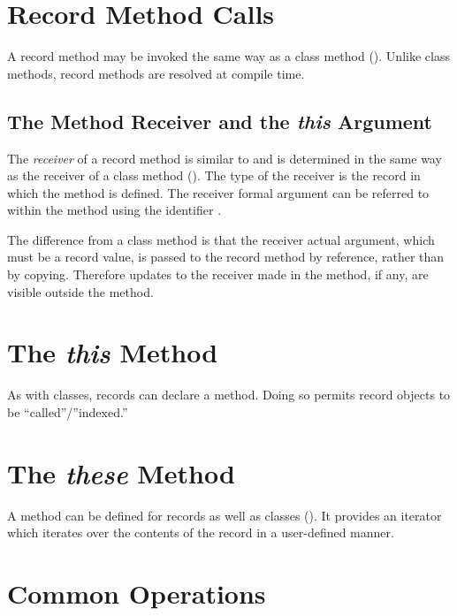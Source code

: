 \section{Record Method Calls}
\label{Record_Method_Access}

A record method may be invoked the same way as a class method
().  Unlike class methods, record methods are
resolved at compile time.  

\subsection{The Method Receiver and the {\em this} Argument}
\label{The_this_Reference}

The \emph{receiver} of a record method is similar to and is determined in the
same way as the receiver of a class method ().
The type of the receiver is the record in which the method is defined.
The receiver formal argument can be referred to within the method
using the identifier .

The difference from a class method is that the receiver actual argument,
which must be a record value, is passed to the record method by reference,
rather than by copying. Therefore updates to the receiver made in the
method, if any, are visible outside the method.

\section{The {\em this} Method}

As with classes, records can declare a  method.  Doing so
permits record objects to be ``called''/''indexed.''

\section{The {\em these} Method}

A  method can be defined for records as well as classes ().  It
provides an iterator which iterates over the contents of the record in a
user-defined manner.

\section{Common Operations}

